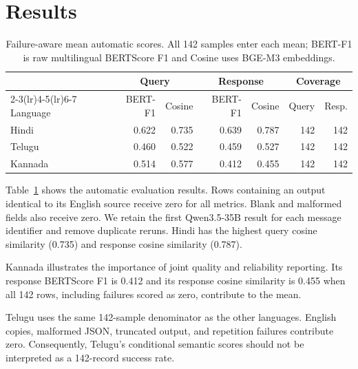 \section{Results}

\begin{table}[t]
\centering
\small
\begin{tabular}{lrrrrrr}
\toprule
 & \multicolumn{2}{c}{Query} & \multicolumn{2}{c}{Response}
 & \multicolumn{2}{c}{Coverage} \\
\cmidrule(lr){2-3}\cmidrule(lr){4-5}\cmidrule(lr){6-7}
Language & BERT-F1 & Cosine & BERT-F1 & Cosine & Query & Resp. \\
\midrule
Hindi   & 0.622 & 0.735 & 0.639 & 0.787 & 142 & 142 \\
Telugu  & 0.460 & 0.522 & 0.459 & 0.527 & 142 & 142 \\
Kannada & 0.514 & 0.577 & 0.412 & 0.455 & 142 & 142 \\
\bottomrule
\end{tabular}
\caption{Failure-aware mean automatic scores. All 142 samples enter each mean;
BERT-F1 is raw multilingual BERTScore F1 and Cosine uses BGE-M3 embeddings.}
\label{tab:main-results}
\end{table}

Table~\ref{tab:main-results} shows the automatic evaluation results. Rows
containing an output identical to its English source receive zero for all
metrics. Blank and malformed fields also receive zero. We retain the first
Qwen3.5-35B result for each message identifier and remove duplicate reruns.
Hindi has the highest query cosine similarity (0.735) and response cosine
similarity (0.787).

Kannada illustrates the importance of joint quality and reliability reporting.
Its response BERTScore F1 is 0.412 and its response cosine similarity is 0.455
when all 142 rows, including failures scored as zero, contribute to the mean.

Telugu uses the same 142-sample denominator as the other languages. English
copies, malformed JSON, truncated output, and repetition failures contribute
zero.
Consequently, Telugu's conditional semantic scores should not be interpreted as
a 142-record success rate.
